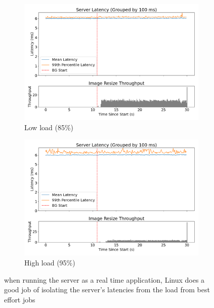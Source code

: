 \begin{figure}[t]
    \centering
    \begin{subfigure}[t]{\columnwidth}
        \includegraphics[width=\columnwidth]{graphs/srv-bg-rt-low.png}
        \caption{Low load (85\%)}\label{fig:srv-bg-rt-low}
        \vspace{12pt}
    \end{subfigure}
    \hspace{\fill}
    \begin{subfigure}[t]{\columnwidth}
        \includegraphics[width=\columnwidth]{graphs/srv-bg-rt-high.png}
        \caption{High load (95\%)}\label{fig:srv-bg-rt-high}
    \end{subfigure}
    \vspace{4pt}
    \caption{when running the server as a real time application, Linux does a
     good job of isolating the server's latencies from the load from best effort
     jobs }\label{fig:srv-bg-rt}
\end{figure}


